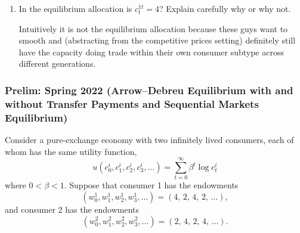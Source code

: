 \documentclass[11pt,english]{article}
\begin{document}
\begin{enumerate}
    \item[d)] In the equilibrium allocation is $c_t^{1t} = 4$? Explain
        carefully why or why not.
    \begin{solution}
 Intuitively it is not the equilibrium allocation because these guys want to smooth and (abstracting from the competitive prices setting) definitely still have the capacity doing trade within their own consumer subtype across different generations.
    \end{solution}
\end{enumerate}

\subsubsection{Prelim: Spring 2022 (Arrow--Debreu Equilibrium with and without Transfer Payments
and Sequential Markets Equilibrium)}
Consider a pure-exchange economy with two infinitely lived consumers, each of
whom has the same utility function,
\[
    u(c_0^i, c_1^i, c_2^i, c_3^i, \ldots)
    = \sum_{t=0}^{\infty} \beta^t \log c_t^i
\]
where $0 < \beta < 1$. Suppose that consumer 1 has the endowments
\[
    (w_0^1, w_1^1, w_2^1, w_3^1, \ldots) = (4,\, 2,\, 4,\, 2,\, \ldots),
\]
and consumer 2 has the endowments
\[
    (w_0^2, w_1^2, w_2^2, w_3^2, \ldots) = (2,\, 4,\, 2,\, 4,\, \ldots).
\]
 
\end{document}

